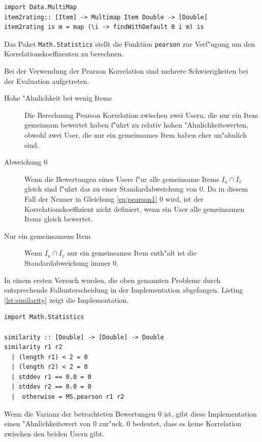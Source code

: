\documentclass[a4paper, 12pt]{article}
\begin{document}
\begin{lstlisting}[caption=Implementation: Abbildung Items zu Bewertungen, label=lst:item2rating]
import Data.MultiMap
item2rating:: [Item] -> Multimap Item Double -> [Double]
item2rating is m = map (\i -> findWithDefault 0 i m) is
\end{lstlisting}

Das Paket \verb|Math.Statistics| stellt die Funktion \verb|pearson| zur Verf"ugung um den Korrelationskoeffizenten zu berechnen.

Bei der Verwendung der Pearson Korrelation sind mehrere Schwierigkeiten bei der Evaluation aufgetreten.

\begin{description}
\item[Hohe "Ahnlichkeit bei wenig Items] Die Berechnung Pearson Korrelation zwischen zwei Usern, die nur ein Item gemeinsam bewertet haben f"uhrt zu relativ hohen "Ahnlichkeitswerten, obwohl zwei User, die nur ein gemeinsames Item haben eher un"ahnlich sind.
\item[Abweichung 0] Wenn die Bewertungen eines Users f"ur alle gemeinsame Items  $I_u \cap I_v$ gleich sind f"uhrt das zu einer Standardabweichung von 0. Da in diesem Fall der Nenner in Gleichung \ref{eq:pearson1} 0 wird, ist der Korrelationskoeffizient nicht definiert, wenn ein User alle gemeinsamen Items gleich bewertet.
\item[Nur ein gemeinsamens Item] Wenn  $I_u \cap I_v$ nur ein gemeinsames Item enth"alt ist die Standardabweichung immer 0.
\end{description}

In einem ersten Versuch wurden, die oben genannten Probleme durch entsprechende Fallunterscheidung in der Implementation abgefangen. Listing \ref{lst:similarity} zeigt die Implementation.

\begin{lstlisting}[caption=Similarity, label=lst:similarity]
import Math.Statistics

similarity :: [Double] -> [Double] -> Double
similarity r1 r2
  | (length r1) < 2 = 0
  | (length r2) < 2 = 0
  | stddev r1 == 0.0 = 0
  | stddev r2 == 0.0 = 0
  |  otherwise = MS.pearson r1 r2

\end{lstlisting}

Wenn die Varianz der betrachteten Bewertungen 0 ist, gibt diese Implementation einen "Ahnlichkeitswert von 0 zur"uck. 0 bedeutet, dass es keine Korrelation zwischen den beiden Usern gibt.
\end{document}
